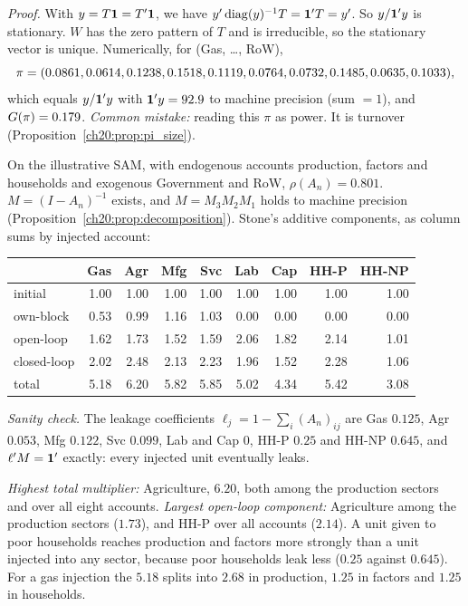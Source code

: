 \documentclass[../solutions_manual.tex]{subfiles}
\begin{document}
 \emph{Proof.} With $y = T\mathbf{1} = T'\mathbf{1}$, we have $y'\operatorname{diag}(y)^{-1}T = \mathbf{1}'T = y'$. So $y/\mathbf{1}'y$ is stationary. $W$ has the zero pattern of $T$ and is irreducible, so the stationary vector is unique. Numerically, for (Gas, \ldots, RoW),
\[
\pi = (0.0861, 0.0614, 0.1238, 0.1518, 0.1119, 0.0764, 0.0732, 0.1485, 0.0635, 0.1033),
\] which equals $y/\mathbf{1}'y$ with $\mathbf{1}'y = 92.9$ to machine precision (sum $= 1$), and $G(\pi) = 0.179$. \emph{Common mistake:} reading this $\pi$ as power. It is turnover (Proposition~\ref{ch20:prop:pi_size}).


 On the illustrative SAM, with endogenous accounts production, factors and households and exogenous Government and RoW, $\rho(A_n) = 0.801$. $M = (I - A_n)^{-1}$ exists, and $M = M_3M_2M_1$ holds to machine precision (Proposition~\ref{ch20:prop:decomposition}). Stone's additive components, as column sums by injected account:
\begin{center}\small
\begin{tabular}{lrrrrrrrr}
\toprule
& Gas & Agr & Mfg & Svc & Lab & Cap & HH-P & HH-NP \\
\midrule
initial & 1.00 & 1.00 & 1.00 & 1.00 & 1.00 & 1.00 & 1.00 & 1.00 \\
own-block & 0.53 & 0.99 & 1.16 & 1.03 & 0.00 & 0.00 & 0.00 & 0.00 \\
open-loop & 1.62 & 1.73 & 1.52 & 1.59 & 2.06 & 1.82 & 2.14 & 1.01 \\
closed-loop & 2.02 & 2.48 & 2.13 & 2.23 & 1.96 & 1.52 & 2.28 & 1.06 \\
\midrule
total & 5.18 & 6.20 & 5.82 & 5.85 & 5.02 & 4.34 & 5.42 & 3.08 \\
\bottomrule
\end{tabular}
\end{center}
\emph{Sanity check.} The leakage coefficients $\ell_j = 1 - \sum_i (A_n)_{ij}$ are Gas $0.125$, Agr $0.053$, Mfg $0.122$, Svc $0.099$, Lab and Cap $0$, HH-P $0.25$ and HH-NP $0.645$, and $\ell'M = \mathbf{1}'$ exactly: every injected unit eventually leaks.

 \emph{Highest total multiplier:} Agriculture, $6.20$, both among the production sectors and over all eight accounts. \emph{Largest open-loop component:} Agriculture among the production sectors ($1.73$), and HH-P over all accounts ($2.14$). A unit given to poor households reaches production and factors more strongly than a unit injected into any sector, because poor households leak less ($0.25$ against $0.645$). For a gas injection the $5.18$ splits into $2.68$ in production, $1.25$ in factors and $1.25$ in households.
\end{document}
